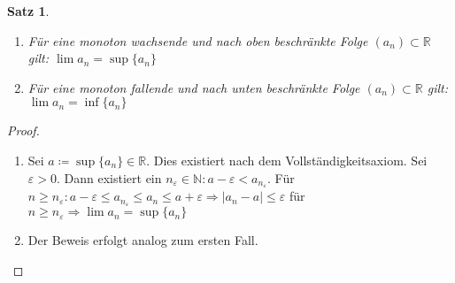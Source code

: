 \documentclass[ngerman,titlepage,twoside, parskip=half*]{scrreprt}
\newcommand*{\N}{\mathbb{N}}
\newcommand*{\R}{\mathbb{R}}
\theoremstyle{plain}
\newtheorem{theorem}{Satz}[section]
\theoremstyle{definition}
\theoremstyle{remark}
\newcommand*{\abs}[2][]{#1\lvert#2#1\rvert}
\begin{document}
\begin{theorem}
  \label{satz:monotoneFolge}
  \begin{enumerate}
  \item Für eine monoton wachsende und nach oben beschränkte Folge
    $(a_n) \subset \R$ gilt: $\lim a_n = \sup \{a_n\}$
  \item Für eine monoton fallende und nach unten beschränkte Folge $(a_n)
    \subset \R$ gilt: $\lim a_n = \inf \{a_n\}$
  \end{enumerate}
\end{theorem}
\begin{proof}
\begin{enumerate}
\item Sei $a \coloneqq \sup \{a_n\} \in \R$. Dies existiert nach dem
  Vollständigkeitsaxiom. Sei $\varepsilon > 0$. Dann existiert ein
  $n_{\varepsilon} \in \N \colon a-\varepsilon < a_{n_{\varepsilon}}$. Für
  $n \geq n_{\varepsilon} \colon a-\varepsilon \leq a_{n_{\varepsilon}}
  \leq a_n \leq a+\varepsilon\Rightarrow \abs{a_n-a} \leq \varepsilon$ für
  $n \geq n_{\varepsilon} \Rightarrow \lim a_n= \sup \{a_n\}$
\item Der Beweis erfolgt analog zum ersten Fall.
\end{enumerate}
\end{proof}
\end{document}
